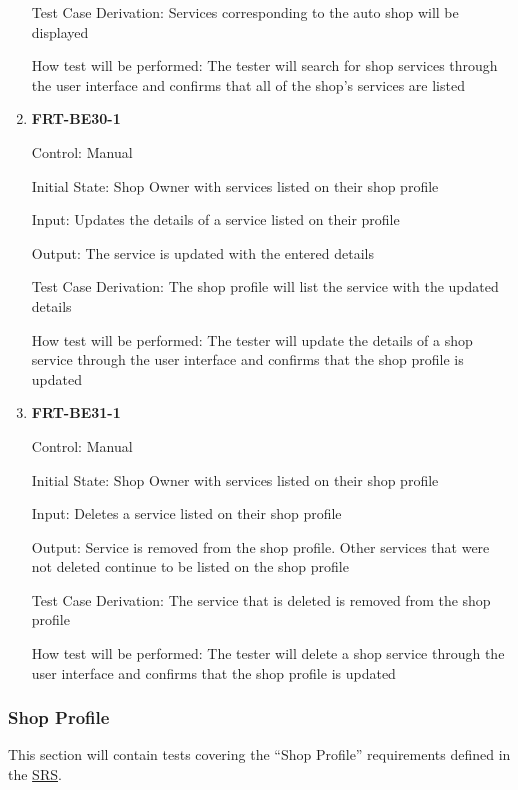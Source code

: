 \documentclass[12pt, titlepage]{article}
\begin{document}
\begin{enumerate}
	      Test Case Derivation: Services corresponding to the auto shop will be displayed

	      How test will be performed: The tester will search for shop services through the user interface and
	      confirms that all of the shop's services are listed

	\item \textbf{FRT-BE30-1}

	      Control: Manual

	      Initial State: Shop Owner with services listed on their shop profile

	      Input: Updates the details of a service listed on their profile

	      Output: The service is updated with the entered details

	      Test Case Derivation: The shop profile will list the service with the updated details

	      How test will be performed: The tester will update the details of a shop service through the user
	      interface and confirms that the shop profile is updated

	\item \textbf{FRT-BE31-1}

	      Control: Manual

	      Initial State: Shop Owner with services listed on their shop profile

	      Input: Deletes a service listed on their shop profile

	      Output: Service is removed from the shop profile. Other services that were not deleted continue to
	      be listed on the shop profile

	      Test Case Derivation: The service that is deleted is removed from the shop profile

	      How test will be performed: The tester will delete a shop service through the user interface and
	      confirms that the shop profile is updated

\end{enumerate}

\subsubsection{Shop Profile}

This section will contain tests covering the ``Shop Profile'' requirements defined in the
\href{https://github.com/arkinmodi/project-sayyara/blob/main/docs/SRS/SRS.pdf}{SRS}.
\end{document}
